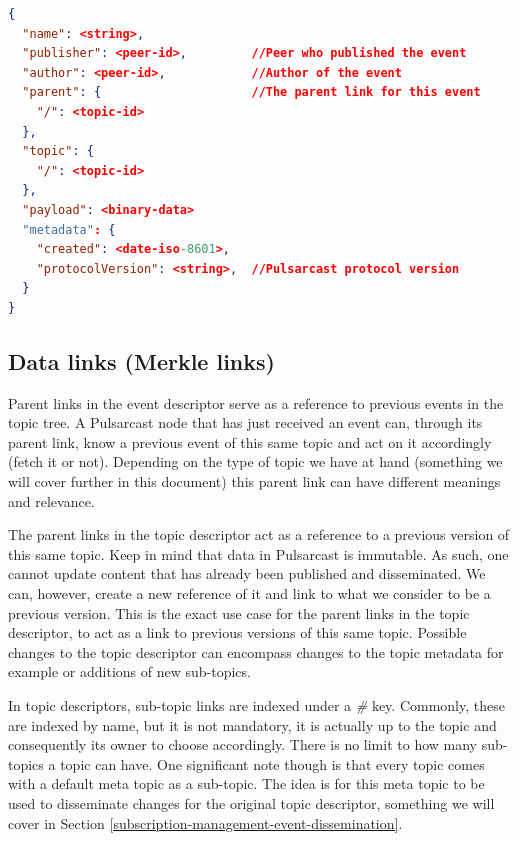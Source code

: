 \begin{lstlisting}[float, language=JSON,caption={Event descriptor schema in a JSON based format},label={event-descriptor}]
{
  "name": <string>,
  "publisher": <peer-id>,         //Peer who published the event
  "author": <peer-id>,            //Author of the event
  "parent": {                     //The parent link for this event
    "/": <topic-id>
  },
  "topic": {
    "/": <topic-id>
  },
  "payload": <binary-data>
  "metadata": {
    "created": <date-iso-8601>,
    "protocolVersion": <string>,  //Pulsarcast protocol version
  }
}
\end{lstlisting}

\subsection{Data links (Merkle links)}\label{subsec:data-links}

Parent links in the event descriptor serve as a reference to previous events in
the topic tree. A Pulsarcast node that has just received an event can, through
its parent link, know a previous event of this same topic and act on it
accordingly (fetch it or not). Depending on the type of topic we have at hand
(something we will cover further in this document) this parent link can have
different meanings and relevance.

The parent links in the topic descriptor act as a reference to a previous
version of this same topic. Keep in mind that data in Pulsarcast is immutable.
As such, one cannot update content that has already been published and
disseminated. We can, however, create a new reference of it and link to what we
consider to be a previous version. This is the exact use case for the parent
links in the topic descriptor, to act as a link to previous versions of this
same topic. Possible changes to the topic descriptor can encompass changes to
the topic metadata for example or additions of new sub-topics.

In topic descriptors, sub-topic links are indexed under a \emph{\#} key.
Commonly, these are indexed by name, but it is not mandatory, it is actually up
to the topic and consequently its owner to choose accordingly.  There is no
limit to how many sub-topics a topic can have. One significant note though is
that every topic comes with a default meta topic as a sub-topic. The idea is
for this meta topic to be used to disseminate changes for the original topic
descriptor, something we will cover in Section
\ref{subscription-management-event-dissemination}.

